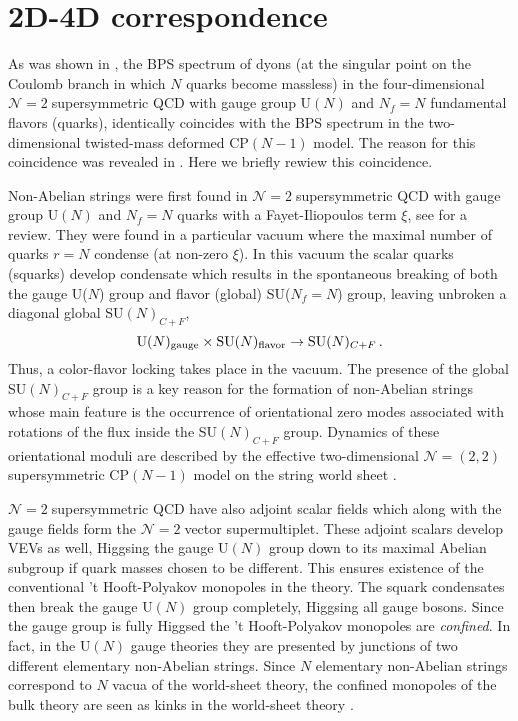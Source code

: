 \documentclass[epsfig,12pt]{article}
\def\beq{\begin{equation}}
\def\eeq{\end{equation}}
\newcommand{\ntwo}{${\mathcal N}=2\;$}
\def\beq{\begin{equation}}
\def\eeq{\end{equation}}
\newcommand{\ntwot}{${\mathcal N}= \left(2,2\right) $ }
\begin{document}
\section{2D-4D correspondence}
\setcounter{equation}{0}
\label{2D4D}

As was shown in \cite{Dorey:1998yh},
the BPS spectrum of dyons (at the singular point on the Coulomb branch 
in which  $N$ quarks become massless) in the
four-dimensional \ntwo supersymmetric QCD with gauge group U$(N)$ and  $N_f=N$ fundamental flavors (quarks), identically
coincides with the BPS spectrum in the two-dimensional twisted-mass deformed CP$(N-1)$ model.
 The reason for this coincidence was revealed 
in \cite{Shifman:2004dr,4}. Here we briefly rewiew this coincidence.

Non-Abelian strings \cite{1,2} were first found in \ntwo supersymmetric QCD with gauge group U$(N)$ and  $N_f=N$ quarks with a Fayet-Iliopoulos term $\xi$, see \cite{Trev,Jrev,SYrev,Trev2} for a review.
 They were found in a 
 particular vacuum where the maximal number of quarks $r=N$ condense (at non-zero $\xi$).
In this vacuum the scalar quarks (squarks) develop condensate which results in  the spontaneous
breaking of both the gauge U($N$) group and flavor (global) SU($N_f=N$) group, leaving unbroken a
  diagonal global SU$(N)_{C+F}$,
\beq
{\rm U}(N)_{\rm gauge}\times {\rm SU}(N)_{\rm flavor}
\to {\rm SU}(N)_{C+F}\,.
\label{c+f}
\eeq
Thus, a color-flavor locking takes place in the vacuum.
The presence of the global SU$(N)_{C+F}$ group is a key reason for the
formation of non-Abelian strings whose main feature is
the occurrence  of orientational zero modes associated with rotations of the flux
inside the  SU$(N)_{C+F}$ group. Dynamics of these orientational moduli are described by
the effective two-dimensional   \ntwot supersymmetric CP$(N-1)$ model on
the string world sheet \cite{1,2,Shifman:2004dr,4}. 


\ntwo supersymmetric
 QCD have also adjoint scalar fields which along with the gauge fields form the \ntwo vector supermultiplet. These  adjoint scalars develop  VEVs as well, Higgsing
 the gauge U$(N)$ group
 down to its maximal Abelian subgroup if quark masses chosen to be different.
 This ensures existence of the conventional  't Hooft-Polyakov monopoles in the theory.
 The squark condensates then break the gauge U$(N)$ group completely, Higgsing all gauge bosons.
Since  the gauge group is fully Higgsed
the 't Hooft-Polyakov monopoles
are {\em confined}.  In fact, in
the   U$(N)$
gauge theories they are presented by junctions of two  different elementary non-Abelian strings.
Since $N$ elementary non-Abelian strings correspond to $N$ vacua of the world-sheet theory,
the   confined
monopoles of the bulk theory are seen as kinks in the world-sheet 
theory \cite{Tong,Shifman:2004dr,4}.
\end{document}
